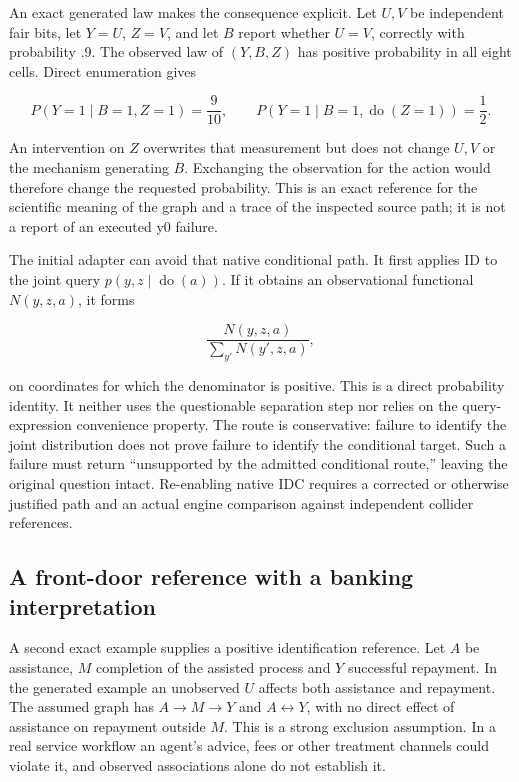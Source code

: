 An exact generated law makes the consequence explicit. Let \(U,V\) be
independent fair bits, let \(Y=U\), \(Z=V\), and let \(B\) report
whether \(U=V\), correctly with probability \(.9\). The observed law of
\((Y,B,Z)\) has positive probability in all eight cells. Direct
enumeration gives

\[
 P(Y=1\mid B=1,Z=1)=\frac9{10},
 \qquad
 P(Y=1\mid B=1,\operatorname{do}(Z=1))=\frac12.
\]

An intervention on \(Z\) overwrites that measurement but does not change
\(U,V\) or the mechanism generating \(B\). Exchanging the observation
for the action would therefore change the requested probability. This is
an exact reference for the scientific meaning of the graph and a trace
of the inspected source path; it is not a report of an executed y0
failure. \citep{exec13_y0_oracles}

The initial adapter can avoid that native conditional path. It first
applies ID to the joint query \(p(y,z\mid\operatorname{do}(a))\). If it
obtains an observational functional \(N(y,z,a)\), it forms

\[
 \frac{N(y,z,a)}{\sum_{y'}N(y',z,a)},
\]

on coordinates for which the denominator is positive. This is a direct
probability identity. It neither uses the questionable separation step
nor relies on the query-expression convenience property. The route is
conservative: failure to identify the joint distribution does not prove
failure to identify the conditional target. Such a failure must return
``unsupported by the admitted conditional route,'' leaving the original
question intact. Re-enabling native IDC requires a corrected or
otherwise justified path and an actual engine comparison against
independent collider references.

\hypertarget{a-front-door-reference-with-a-banking-interpretation}{%
\subsection{A front-door reference with a banking
interpretation}\label{a-front-door-reference-with-a-banking-interpretation}}

A second exact example supplies a positive identification reference. Let
\(A\) be assistance, \(M\) completion of the assisted process and \(Y\)
successful repayment. In the generated example an unobserved \(U\)
affects both assistance and repayment. The assumed graph has
\(A\to M\to Y\) and \(A\leftrightarrow Y\), with no direct effect of
assistance on repayment outside \(M\). This is a strong exclusion
assumption. In a real service workflow an agent's advice, fees or other
treatment channels could violate it, and observed associations alone do
not establish it.


